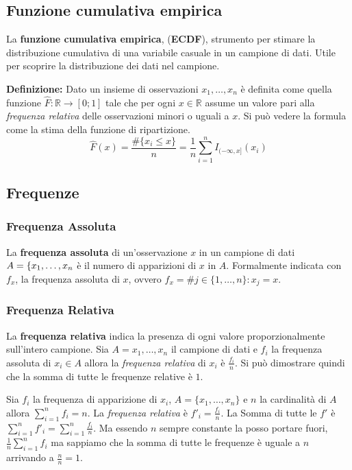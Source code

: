 \documentclass{article}
\begin{document}
    \subsection{Funzione cumulativa empirica}
      La \textbf{funzione cumulativa empirica}, (\textbf{ECDF}), strumento per stimare la distribuzione cumulativa di una variabile casuale in un campione di dati. Utile per scoprire la distribuzione dei dati nel campione. 
    \begin{tcolorbox}
      \textbf{Definizione:} Dato un insieme di osservazioni ${x_1, \dots, x_n}$ è definita come quella funzione $\hat{F}:\mathbb{R}\to[0;1]$ tale che per ogni $x\in\mathbb{R}$ assume un valore pari alla \textit{frequenza relativa} delle osservazioni minori o uguali a $x$. Si può vedere la formula come la stima della funzione di ripartizione.
      $$\hat{F}(x)=\frac{\# \{x_i\le x\}}{n}=\frac{1}{n}\sum_{i=1}^{n}I_{(-\infty,x]}(x_i)$$

    \end{tcolorbox}

    \subsection{Frequenze}
      \subsubsection*{Frequenza Assoluta}
        La \textbf{frequenza assoluta} di un'osservazione $x$ in un campione di dati $A=\{x_1,\dots,x_n\*$ è il numero di apparizioni di $x$ in $A$. Formalmente indicata con $f_x$, la frequenza assoluta di $x$, ovvero $f_x= \#{j \in \{1,\dots,n\}:x_j=x}$.

      \subsubsection*{Frequenza Relativa}
        La \textbf{frequenza relativa} indica la presenza di ogni valore proporzionalmente sull'intero campione. Sia $A = {x_1, \dots, x_n}$ il campione di dati e $f_i$ la frequenza assoluta di $x_i \in A$ allora la \textit{frequenza relativa} di $x_i$ è $\frac{f_i}{n}$. Si può dimostrare quindi che la somma di tutte le frequenze relative è $1$.
      
        \begin{tcolorbox}
          Sia $f_i$ la frequenza di apparizione di $x_i$, $A=\{x_1,\dots,x_n\}$ e $n$ la cardinalità di $A$ allora $\sum_{i=1}^{n} f_i=n$. La \textit{frequenza relativa} è $f'_i=\frac{f_i}{n}$. La Somma di tutte le $f'$ è $\sum_{i=1}^{n} f'_i = \sum_{i=1}^{n} \frac{f_i}{n}$. Ma essendo $n$ sempre constante la posso portare fuori, $\frac{1}{n}\sum_{i=1}^{n}f_i$ ma sappiamo che la somma di tutte le frequenze è uguale a $n$ arrivando a $\frac{n}{n}=1$.
        \end{tcolorbox} 
    
\end{document}
